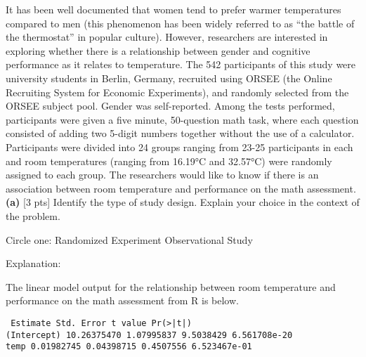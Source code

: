 \documentclass[12pt, oneside]{article}
\newcommand{\noi}{\noindent}
\begin{document}
\noi {\bf Q1.} It has been well documented that women tend to prefer warmer
temperatures compared to men (this phenomenon has been widely referred to as
“the battle of the thermostat” in popular culture). However, researchers are
interested in exploring whether there is a relationship between gender and
cognitive performance as it relates to temperature. The 542 participants of this
study were university students in Berlin, Germany, recruited using ORSEE (the
Online Recruiting System for Economic Experiments), and randomly selected from
the ORSEE subject pool. Gender was self-reported. Among the tests performed,
participants were given a five minute, 50-question math task, where each
question consisted of adding two 5-digit numbers together without the use of a 
calculator.  Participants were divided into 24 groups ranging from 23-25
participants in each and room temperatures (ranging from 16.19°C and 32.57°C)
were randomly assigned to each group. The researchers would like to know if
there is an association between room temperature and performance on the math
assessment. \\

\noi
{\bf (a)} [3 pts] Identify the type of study design.  Explain your choice in the
context of the problem.

\vspace{0.25cm}

\begin{center}
Circle one:	\hspace{1cm} Randomized Experiment	\hspace{2cm}	Observational Study
\end{center}

\vspace{0.25cm}

Explanation:

\vspace{1in}


The linear model output for the relationship between room temperature and performance on the math assessment from R is below.
\begin{center}
\texttt{
\noi           Estimate     Std. Error   t value     Pr(>|t|) \\
(Intercept)   10.26375470   1.07995837   9.5038429   6.561708e-20 \\
temp           0.01982745   0.04398715   0.4507556   6.523467e-01
}
\end{center}

\vspace{0.25cm}
\end{document}
